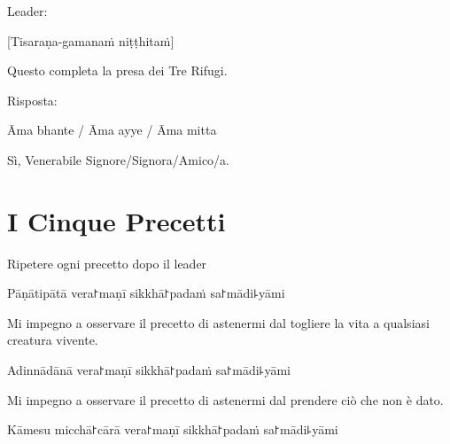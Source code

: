\begin{instruction}
  Leader:
\end{instruction}

[Tisaraṇa-gamanaṁ niṭṭhitaṁ]

\begin{english}
  Questo completa la presa dei Tre Rifugi.
\end{english}

\begin{instruction}
  Risposta:
\end{instruction}

Āma bhante / Āma ayye / Āma mitta

\begin{english}
  Sì, Venerabile Signore/Signora/Amico/a.
\end{english}

\chapter{I Cinque Precetti}

\begin{instruction}
  Ripetere ogni precetto dopo il leader
\end{instruction}

\begin{precept}
  \setcounter{enumi}{0}
  \item Pāṇātipātā vera꜓maṇī sikkhā꜓padaṁ sa꜓mādi꜕yāmi
\end{precept}

\begin{english}
  Mi impegno a osservare il precetto di astenermi dal togliere la vita a qualsiasi creatura vivente.
\end{english}

\begin{precept}
  \setcounter{enumi}{1}
  \item Adinnādānā vera꜓maṇī sikkhā꜓padaṁ sa꜓mādi꜕yāmi
\end{precept}

\begin{english}
  Mi impegno a osservare il precetto di astenermi dal prendere ciò che non è dato.
\end{english}

\begin{precept}
  \setcounter{enumi}{2}
  \item Kāmesu micchā꜓cārā vera꜓maṇī sikkhā꜓padaṁ sa꜓mādi꜕yāmi
\end{precept}

